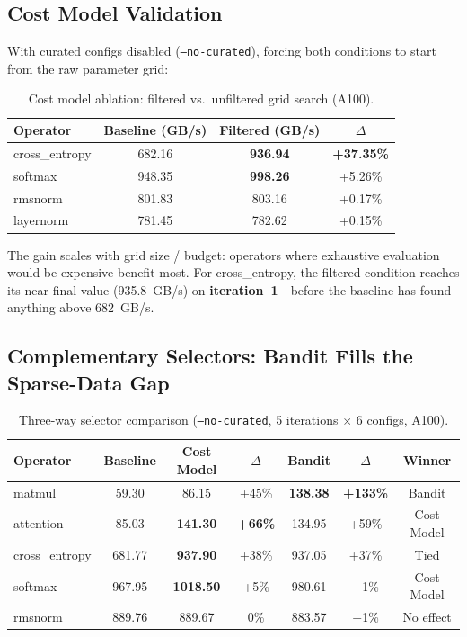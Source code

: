 \documentclass[11pt]{article}
\begin{document}
\subsection{Cost Model Validation}
\label{sec:cost-model-validation}

With curated configs disabled (\texttt{--no-curated}), forcing both conditions to
start from the raw parameter grid:

\begin{table}[t]
\centering
\caption{Cost model ablation: filtered vs.\ unfiltered grid search (A100).}
\label{tab:cost-model}
\small
\begin{tabular}{@{}lccc@{}}
\toprule
Operator & Baseline (GB/s) & Filtered (GB/s) & $\Delta$ \\
\midrule
cross\_entropy & 682.16 & \textbf{936.94} & \textbf{+37.35\%} \\
softmax & 948.35 & \textbf{998.26} & +5.26\% \\
rmsnorm & 801.83 & 803.16 & +0.17\% \\
layernorm & 781.45 & 782.62 & +0.15\% \\
\bottomrule
\end{tabular}
\end{table}

The gain scales with grid size / budget: operators where exhaustive evaluation
would be expensive benefit most. For cross\_entropy, the filtered condition
reaches its near-final value (935.8~GB/s) on \textbf{iteration~1}---before the
baseline has found anything above 682~GB/s.


\subsection{Complementary Selectors: Bandit Fills the Sparse-Data Gap}
\label{sec:selectors}

\begin{table}[t]
\centering
\caption{Three-way selector comparison (\texttt{--no-curated}, 5 iterations $\times$ 6 configs, A100).}
\label{tab:selectors}
\small
\begin{tabular}{@{}lcccccc@{}}
\toprule
Operator & Baseline & Cost Model & $\Delta$ & Bandit & $\Delta$ & Winner \\
\midrule
matmul & 59.30 & 86.15 & +45\% & \textbf{138.38} & \textbf{+133\%} & Bandit \\
attention & 85.03 & \textbf{141.30} & \textbf{+66\%} & 134.95 & +59\% & Cost Model \\
cross\_entropy & 681.77 & \textbf{937.90} & +38\% & 937.05 & +37\% & Tied \\
softmax & 967.95 & \textbf{1018.50} & +5\% & 980.61 & +1\% & Cost Model \\
rmsnorm & 889.76 & 889.67 & 0\% & 883.57 & $-$1\% & No effect \\
\bottomrule
\end{tabular}
\end{table}
\end{document}
